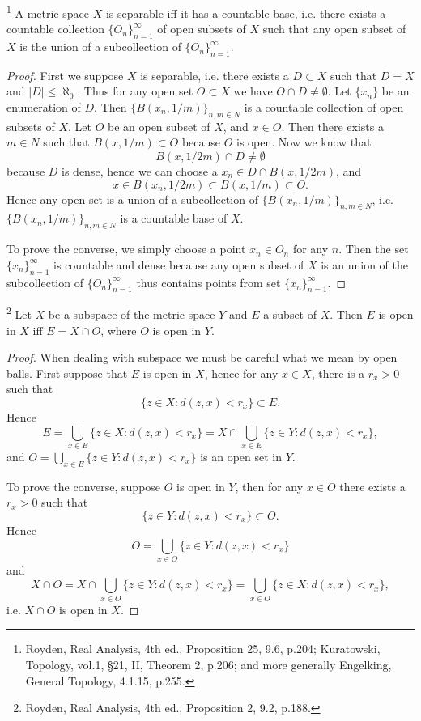 \begin{proposition} \label{P:sep_base}
\footnote{Royden, Real Analysis, 4th ed., Proposition 25, 9.6, p.204; 
    Kuratowski, Topology, vol.1, \S 21, II, Theorem 2, p.206;
    and more generally Engelking, General Topology, 4.1.15, p.255.}
A metric space $X$ is separable iff it has a countable base, i.e. there exists a
countable collection $\{O_n\}_{n=1}^{\infty}$ of open subsets of $X$ such that
any open subset of $X$ is the union of a subcollection of 
$\{O_n\}_{n=1}^{\infty}$. 
\end{proposition}
\begin{proof}
First we suppose $X$ is separable, i.e. there exists a $D\subset X$ such that 
$\overline{D}=X$ and $|D|\leq\aleph_0$. Thus for any open set $O\subset X$ we have 
$O\cap D\neq\emptyset$. Let $\{x_n\}$ be an enumeration of $D$. Then 
$\{B(x_n,1/m)\}_{n,m\in N}$
is a countable collection of open subsets of $X$. Let $O$ be an open subset of
$X$, and $x\in O$. Then there exists a $m\in N$ such that $B(x,1/m)\subset O$
because $O$ is open. Now we know that 
\[
  B(x,1/2m)\cap D\neq \emptyset
\]
because $D$ is dense, hence we can choose a $x_n\in D\cap B(x,1/2m)$, and
\[
  x\in B(x_n,1/2m) \subset B(x,1/m) \subset O.
\]
Hence any open set is a union of a subcollection of $\{B(x_n,1/m)\}_{n,m\in N}$,
i.e. $\{B(x_n,1/m)\}_{n,m\in N}$ is a countable base of $X$.

To prove the converse, we simply choose a point $x_n\in O_n$ for any $n$. Then
the set $\{x_n\}_{n=1}^{\infty}$ is countable and dense because any open subset
of $X$ is an union of the subcollection of $\{O_n\}_{n=1}^{\infty}$ thus
contains points from set $\{x_n\}_{n=1}^{\infty}$.
\end{proof}

\begin{lemma}
\footnote{Royden, Real Analysis, 4th ed., Proposition 2, 9.2, p.188.} 
Let $X$ be a subspace of the metric space $Y$ and $E$ a subset of $X$. Then $E$
is open in $X$ iff $E=X\cap O$, where $O$ is open in $Y$.
\end{lemma}
\begin{proof}
When dealing with subspace we must be careful what we mean by open balls.
First suppose that $E$ is open in $X$, hence for any $x\in X$, there is a 
$r_x>0$ such that
\[
  \{z\in X: d(z,x)<r_x\} \subset E.
\]
Hence
\[
  E= \bigcup_{x\in E} \{ z\in X : d(z,x) < r_x \} 
   = X \cap \bigcup_{x\in E} \{ z\in Y : d(z,x) < r_x \},
\]
and $O= \bigcup_{x\in E} \{ z\in Y : d(z,x) < r_x \}$ is an open set in $Y$.

To prove the converse, suppose $O$ is open in $Y$, then for any $x\in O$ there
exists a $r_x>0$ such that
\[
  \{z\in Y: d(z,x)<r_x\} \subset O.
\]
Hence
\[
  O= \bigcup_{x\in O} \{ z\in Y : d(z,x) < r_x \} 
\]
and
\[
  X\cap O= X\cap \bigcup_{x\in O} \{ z\in Y : d(z,x) < r_x \} 
    = \bigcup_{x\in O} \{ z\in X : d(z,x) < r_x \},
\]
i.e. $X\cap O$ is open in $X$.
\end{proof}

